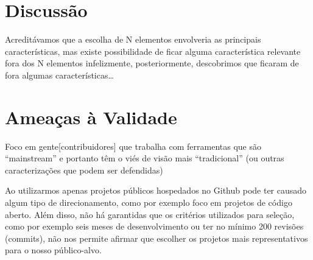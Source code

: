 \begin{table}[htpb]
\centering
{}
\caption{Ordenamento das sugestões pelo grau de dificuldade.}
\label{tab:ranking_implementacao_sug_melhorias}
\end{table}

\section{Discussão}
\label{sec:sug_melhoria_discussao}

Acreditávamos que a escolha de N elementos envolveria as principais
características, mas existe possibilidade de ficar alguma característica
relevante fora dos N elementos infelizmente, posteriormente, descobrimos que
ficaram de fora algumas características\dots

\section{Ameaças à Validade}
\label{sec:sug_melhoria_ameacas}

Foco em gente[contribuidores] que trabalha com ferramentas que são
``mainstream'' e portanto têm o viés de visão mais ``tradicional'' (ou outras
caracterizações que podem ser defendidas)

Ao utilizarmos apenas projetos públicos hospedados no Github pode ter causado
algum tipo de direcionamento, como por exemplo foco em projetos de código
aberto. Além disso, não há garantidas que os critérios utilizados para seleção,
como por exemplo seis meses de desenvolvimento ou ter no mínimo 200 revisões
(commits), não nos permite afirmar que escolher os projetos mais
representativos para o nosso público-alvo.

